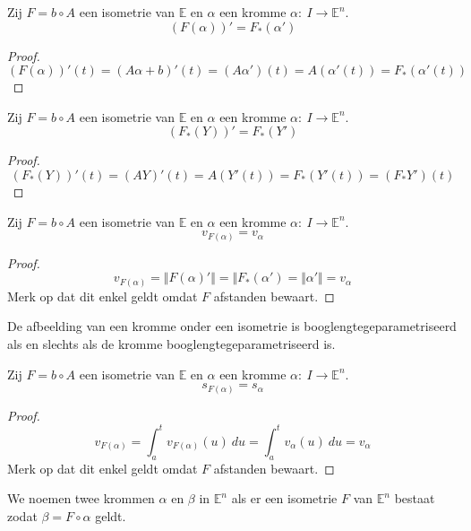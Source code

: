 \documentclass[main.tex]{subfiles}
\begin{document}
\begin{st}
  \label{st:rekenregel-afgeleide-afbeelding-na-isometrie}
  Zij $F = b \circ A$ een isometrie van $\mathbb{E}$ en $\alpha$ een kromme $\alpha:\ I\rightarrow \mathbb{E}^{n}$.
  \[ (F(\alpha))' = F_{*}(\alpha') \]
  \begin{proof}
    \[ (F(\alpha))'(t) = (A\alpha + b)'(t) = (A\alpha')(t) = A(\alpha'(t)) = F_{*}(\alpha'(t)) \]
  \end{proof}
\end{st}

\begin{st}
  Zij $F = b \circ A$ een isometrie van $\mathbb{E}$ en $\alpha$ een kromme $\alpha:\ I\rightarrow \mathbb{E}^{n}$.
  \[ (F_{*}(Y))' = F_{*}(Y') \]
  \begin{proof}
    \[ (F_{*}(Y))'(t) = (AY)'(t) = A(Y'(t)) = F_{*}(Y'(t)) = (F_{*}Y')(t) \]
  \end{proof}
\end{st}

\begin{st}
  Zij $F = b \circ A$ een isometrie van $\mathbb{E}$ en $\alpha$ een kromme $\alpha:\ I\rightarrow \mathbb{E}^{n}$.
  \[ v_{F(\alpha)} = v_{\alpha} \]
  \begin{proof}
    \[ v_{F(\alpha)} = \Vert F(\alpha)' \Vert = \Vert F_{*}(\alpha') = \Vert \alpha' \Vert = v_{\alpha} \]
    Merk op dat dit enkel geldt omdat $F$ afstanden bewaart.
  \end{proof}
\end{st}

\begin{gev}
  De afbeelding van een kromme onder een isometrie is booglengtegeparametriseerd als en slechts als de kromme booglengtegeparametriseerd is.
\end{gev}

\begin{st}
  Zij $F = b \circ A$ een isometrie van $\mathbb{E}$ en $\alpha$ een kromme $\alpha:\ I\rightarrow \mathbb{E}^{n}$.
  \[ s_{F(\alpha)} = s_{\alpha} \]
  \begin{proof}
    \[ v_{F(\alpha)} = \int_{a}^{t}v_{F(\alpha)}(u)\ du = \int_{a}^{t}v_{\alpha}(u)\ du= v_{\alpha} \]
    Merk op dat dit enkel geldt omdat $F$ afstanden bewaart.
  \end{proof}
\end{st}


\begin{de}
  We noemen twee krommen $\alpha$ en $\beta$ in $\mathbb{E}^{n}$  als er een isometrie $F$ van $\mathbb{E}^{n}$ bestaat zodat $\beta = F \circ \alpha$ geldt.
\end{de}
\end{document}
